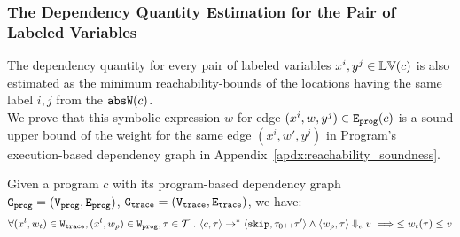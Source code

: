 \subsubsection{The Dependency Quantity Estimation for the Pair of Labeled Variables}
\label{sec:static-quantity-edge}
The dependency quantity for every pair of labeled variables $x^i, y^j \in \mathbb{LV}(c)$ is also estimated
as the minimum reachability-bounds of the locations having the same label $i, j$
from the $\mathtt{abs}{\mathtt{W}}(c)$.
\\
%
We prove that this 
symbolic expression $w$ for edge $(x^i, w, y^j) \in \mathtt{{E_{prog}}}(c)$
 is a sound upper bound of 
the weight for the same edge $(x^i, w', y^j)$ in Program's execution-based dependency graph in Appendix~\ref{apdx:reachability_soundness}.
%
\begin{thm}
  \label{thm:edgeweight_soundness}
Given a program ${c}$ with its program-based dependency graph 
$\mathtt{{G_{prog}}} = (\mathtt{{V_{prog}}}, \mathtt{{E_{prog}}})$,
$\mathtt{{G_{trace}}} = (\mathtt{{V_{trace}}}, \mathtt{{E_{trace}}})$, we have:
%
\[
\forall (x^l, w_{t}) \in \mathtt{{W_{trace}}},
(x^l, w_{p}) \in \mathtt{{W_{prog}}}, \mathtt{\tau} \in \mathcal{T} ~.~
\langle {c}, \mathtt{\tau} \rangle \to^{*} \langle \mathtt{skip}, \mathtt{\tau}_0 {\scriptscriptstyle ++} \mathtt{\tau}' \rangle 
\land 
\langle w_{p}, \mathtt{\tau} \rangle \Downarrow_e v
\implies
\leq 
w_{t}(\mathtt{\tau}) \leq v
\]
\end{thm}
